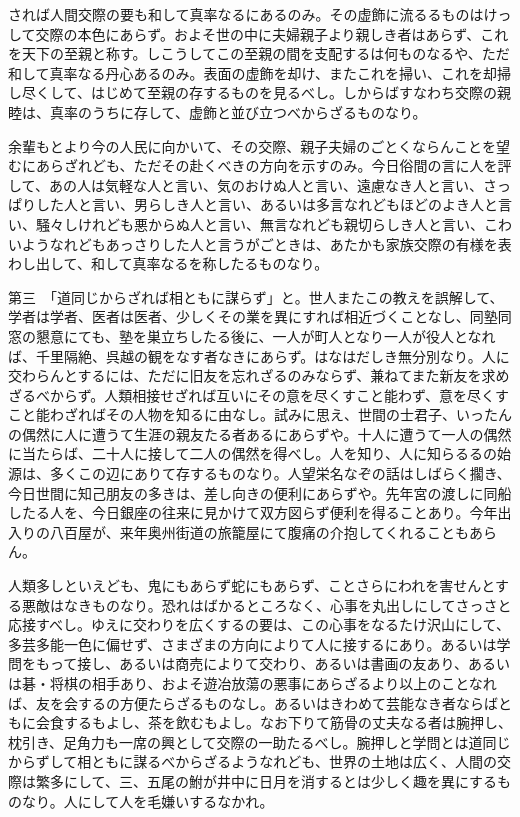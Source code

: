 \documentclass[a4paper, platex, dvipdfmx]{jsarticle}
\begin{document}
されば人間交際の要も和して真率なるにあるのみ。その虚飾に流るるものはけっして交際の本色にあらず。およそ世の中に夫婦親子より親しき者はあらず、これを天下の至親と称す。しこうしてこの至親の間を支配するは何ものなるや、ただ和して真率なる丹心あるのみ。表面の虚飾を却け、またこれを掃い、これを却掃し尽くして、はじめて至親の存するものを見るべし。しからばすなわち交際の親睦は、真率のうちに存して、虚飾と並び立つべからざるものなり。

余輩もとより今の人民に向かいて、その交際、親子夫婦のごとくならんことを望むにあらざれども、ただその赴くべきの方向を示すのみ。今日俗間の言に人を評して、あの人は気軽な人と言い、気のおけぬ人と言い、遠慮なき人と言い、さっぱりした人と言い、男らしき人と言い、あるいは多言なれどもほどのよき人と言い、騒々しけれども悪からぬ人と言い、無言なれども親切らしき人と言い、こわいようなれどもあっさりした人と言うがごときは、あたかも家族交際の有様を表わし出して、和して真率なるを称したるものなり。

第三　「道同じからざれば相ともに謀らず」と。世人またこの教えを誤解して、学者は学者、医者は医者、少しくその業を異にすれば相近づくことなし、同塾同窓の懇意にても、塾を巣立ちしたる後に、一人が町人となり一人が役人となれば、千里隔絶、呉越の観をなす者なきにあらず。はなはだしき無分別なり。人に交わらんとするには、ただに旧友を忘れざるのみならず、兼ねてまた新友を求めざるべからず。人類相接せざれば互いにその意を尽くすこと能わず、意を尽くすこと能わざればその人物を知るに由なし。試みに思え、世間の士君子、いったんの偶然に人に遭うて生涯の親友たる者あるにあらずや。十人に遭うて一人の偶然に当たらば、二十人に接して二人の偶然を得べし。人を知り、人に知らるるの始源は、多くこの辺にありて存するものなり。人望栄名なぞの話はしばらく擱き、今日世間に知己朋友の多きは、差し向きの便利にあらずや。先年宮の渡しに同船したる人を、今日銀座の往来に見かけて双方図らず便利を得ることあり。今年出入りの八百屋が、来年奥州街道の旅籠屋にて腹痛の介抱してくれることもあらん。

人類多しといえども、鬼にもあらず蛇にもあらず、ことさらにわれを害せんとする悪敵はなきものなり。恐れはばかるところなく、心事を丸出しにしてさっさと応接すべし。ゆえに交わりを広くするの要は、この心事をなるたけ沢山にして、多芸多能一色に偏せず、さまざまの方向によりて人に接するにあり。あるいは学問をもって接し、あるいは商売によりて交わり、あるいは書画の友あり、あるいは碁・将棋の相手あり、およそ遊冶放蕩の悪事にあらざるより以上のことなれば、友を会するの方便たらざるものなし。あるいはきわめて芸能なき者ならばともに会食するもよし、茶を飲むもよし。なお下りて筋骨の丈夫なる者は腕押し、枕引き、足角力も一席の興として交際の一助たるべし。腕押しと学問とは道同じからずして相ともに謀るべからざるようなれども、世界の土地は広く、人間の交際は繁多にして、三、五尾の鮒が井中に日月を消するとは少しく趣を異にするものなり。人にして人を毛嫌いするなかれ。
\end{document}
